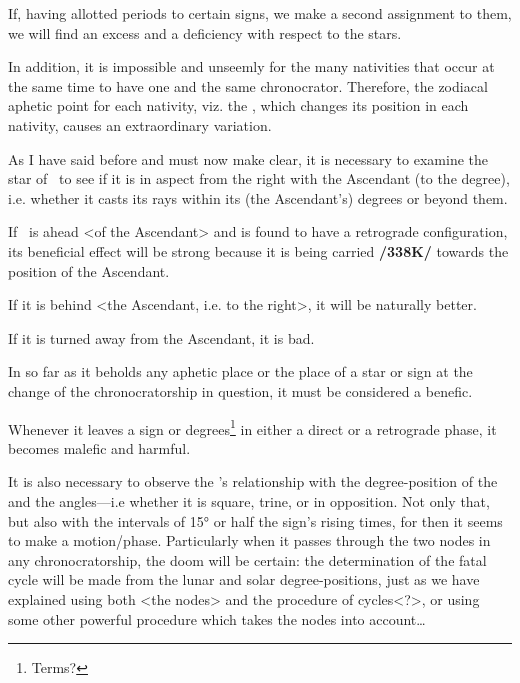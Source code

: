 If, having allotted periods to certain signs, we make a second assignment to them, we will find an excess and a deficiency with respect to the stars.

In addition, it is impossible and unseemly for the many nativities that occur at the same time to have one and the same chronocrator. Therefore, the zodiacal aphetic point for each nativity, viz. the \Moon,
which changes its position in each nativity, causes an extraordinary variation. 

As \mn{\Jupiter} I have said before and must now make clear, it is necessary to examine the star of \Jupiter\, to see if it is in aspect from the right with the Ascendant (to the degree), i.e. whether it casts its rays within its (the Ascendant’s) degrees or beyond them. 

If \Jupiter\, is ahead <of the Ascendant> and is found to have a retrograde configuration, its beneficial effect will be strong because it is being carried \textbf{/338K/} towards the position of the Ascendant. 

If it is behind <the Ascendant, i.e. to the right>, it will be naturally better. 

If it is turned away from the Ascendant, it is bad. 

In so far as it beholds any aphetic place or the place of a star or sign at the change of the chronocratorship in question, it must be considered a benefic. 

Whenever it leaves a sign or degrees\footnote{Terms?} in either a direct or a retrograde phase, it becomes malefic and harmful.

It \mn{\Moon} is also necessary to observe the \Moon’s relationship with the degree-position of the \Sun\, and the angles—i.e whether it is square, trine, or in opposition. Not only that, but also with the intervals of 15° or half the sign's rising times, for then it seems to make a motion/phase. Particularly when it passes through the  two nodes in any chronocratorship, the doom will be certain: the determination of the fatal cycle will be made from the lunar and solar degree-positions, just as we have explained using both <the nodes> and the procedure of cycles<?>, or using some other powerful procedure which takes the nodes into account…


\newpage